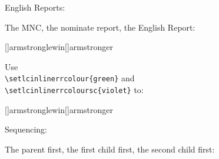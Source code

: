 English Reports:

The MNC, the nominate report, the English Report:
\bigskip

\begin{filecontents}{\democodefile}
[]{armstronglewin}[]{armstronger}\end{filecontents}
\PrintCodeAndResultsStackedR

Use \\\verb|\setlcinlinerrcolour{green}| and \\\verb|\setlcinlinerrcoloursc{violet}| to:

\begin{filecontents}{\democodefile}
[]{armstronglewin}[]{armstronger}\end{filecontents}
\PrintCodeAndResultsStackedR


\spotsep




Sequencing:

The parent first, the first child first, the second child first:
\bigskip

